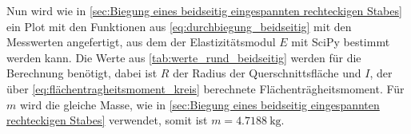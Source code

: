 \begin{table}
    \centering
    \caption{Messergebnisse zu dem beidseitig eingespannten zylindrischen Stab}
    \label{tab:beidseitig_rund}
\end{table}

Nun wird wie in \autoref{sec:Biegung eines beidseitig eingespannten rechteckigen Stabes} ein Plot mit den Funktionen aus \autoref{eq:durchbiegung_beidseitig} mit den Messwerten angefertigt, aus dem der Elastizitätsmodul $E$ mit SciPy bestimmt werden kann. 
Die Werte aus \autoref{tab:werte_rund_beidseitig} werden für die Berechnung benötigt, dabei ist $R$ der Radius der Querschnittsfläche und $I$, der über \autoref{eq:flächentragheitsmoment_kreis} berechnete Flächenträgheitsmoment.
Für $m$ wird die gleiche Masse, wie in \autoref{sec:Biegung eines beidseitig eingespannten rechteckigen Stabes} verwendet, somit ist $m = \SI{4.7188}{\kilogram}$.

